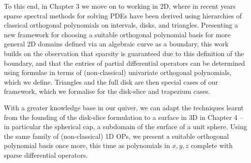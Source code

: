 To this end, in Chapter 3 we move on to working in 2D, where in recent years sparse spectral methods for solving PDEs have been derived using hierarchies of classical orthogonal polynomials on intervals, disks, and triangles. Presenting a new framework for choosing a suitable orthogonal polynomial basis for more general 2D domains defined via an algebraic curve as a boundary, this work builds on the observation that sparsity is guaranteed due to this definition of the boundary, and that the entries of partial differential operators can be determined using formulae in terms of (non-classical) univariate orthogonal polynomials, which we define. Triangles and the full disk are then special cases of our framework, which we formalise for the disk-slice and trapezium cases.

With a greater knowledge base in our quiver, we can adapt the techniques learnt from the founding of the disk-slice formulation to a surface in 3D in Chapter 4 -- in particular the spherical cap, a subdomain of the surface of a unit sphere. Using the same family of (non-classical) 1D OPs, we present a suitable orthogonal polynomial basis once more, this time as polynomials in $x,y,z$ complete with sparse differential operators.







  







